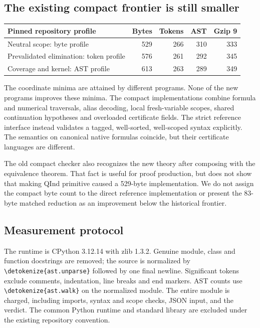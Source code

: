 \documentclass[11pt,letterpaper]{article}
\theoremstyle{definition}\newtheorem{definition}[theorem]{Definition}
\theoremstyle{remark}\newtheorem{remark}[theorem]{Remark}
\newcommand{\file}[1]{\expandafter\nolinkurl\expandafter{\detokenize{#1}}}
\begin{document}
\subsection{The existing compact frontier is still smaller}

\begin{center}\small
\begin{tabular}{lrrrr}
\toprule
Pinned repository profile & Bytes & Tokens & AST & Gzip 9\\
\midrule
Neutral scope: byte profile&529&266&310&333\\
Prevalidated elimination: token profile&576&261&292&345\\
Coverage and kernel: AST profile&613&263&289&349\\
\bottomrule
\end{tabular}
\end{center}

The coordinate minima are attained by different programs. None of the
new programs improves these minima. The compact implementations combine
formula and numerical traversals, alias decoding, local fresh-variable
scopes, shared continuation hypotheses and overloaded certificate fields.
The strict reference interface instead validates a tagged, well-sorted,
well-scoped syntax explicitly. The semantics on canonical native formulas
coincide, but their certificate languages are different.

The old compact checker also recognizes the new theory after composing
with the equivalence theorem. That fact is useful for proof production,
but does not show that making QInd primitive caused a 529-byte
implementation. We do not assign the compact byte count to the direct
reference implementation or present the 83-byte matched reduction as
an improvement below the historical frontier.

\subsection{Measurement protocol}

The runtime is CPython 3.12.14 with zlib 1.3.2. Genuine module, class and
function docstrings are removed; the source is normalized by
\file{ast.unparse} followed by one final newline. Significant tokens
exclude comments, indentation, line breaks and end markers. AST counts
use \file{ast.walk} on the normalized module. The entire module is charged,
including imports, syntax and scope checks, JSON input, and the verdict.
The common Python runtime and standard library are excluded under the
existing repository convention.
\end{document}
